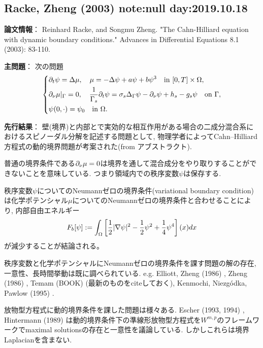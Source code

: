 \documentclass[a4paper]{jsarticle}
\begin{document}
\subsection{Racke, Zheng (2003) \cite{RackeZheng2003} note:null day:2019.10.18}
{\bf 論文情報}：
Reinhard Racke, and Songmu Zheng. "The Cahn-Hilliard equation with dynamic boundary conditions." Advances in Differential Equations 8.1 (2003): 83-110.

{\bf 主問題}：
次の問題
\begin{equation}\left\{\begin{aligned}
	&\partial_t\psi = \Delta\mu,\quad \mu = -\Delta\psi + a\psi + b\psi^3\quad \text{in }[0,T]\times\Omega,\\
	&\partial_{\nu}\mu|_{\Gamma} = 0, \quad \frac{1}{\Gamma_s}\partial_t\psi = \sigma_s\Delta_{\Gamma}\psi - \partial_{\nu}\psi + h_s - g_s\psi\quad\text{on }\Gamma,\\
	&\psi(0,\cdot) = \psi_0\quad\text{in }\Omega.
\end{aligned}\right.\end{equation}

{\bf 先行結果}：
壁(境界)と内部とで実効的な相互作用がある場合の二成分混合系におけるスピノーダル分解を記述する問題として, 物理学者によってCahn--Hilliard方程式の動的境界問題が考案された(from アブストラクト).

普通の境界条件である$\partial_{\nu}\mu=0$は境界を通して混合成分をやり取りすることができないことを意味している.
つまり領域内での秩序変数$\psi$は保存する.

秩序変数$\psi$についてのNeumannゼロの境界条件(variational boundary condition)は化学ポテンシャル$\mu$についてのNeumannゼロの境界条件と合わせることにより, 内部自由エネルギー
\begin{equation}
	F_b[\psi] := \int_{\Omega} \left[\frac{1}{2}|\nabla\psi|^2 - \frac{1}{2}\psi^2 + \frac{1}{4}\psi^4\right](x)dx
\end{equation}
が減少することが結論される。

秩序変数と化学ポテンシャルにNeumannゼロの境界条件を課す問題の解の存在, 一意性、長時間挙動は既に調べられている.
e.g. Elliott, Zheng (1986) \cite{ElliottZheng1986}, Zheng (1986) \cite{Zheng1986}, Temam (BOOK) \cite{TemamBOOK} (最新のものをciteしておく), Kenmochi, Niezg\'odka, Pawlow (1995) \cite{KenmochiNiezgodkaPawlow1995}.

放物型方程式に動的境界条件を課した問題は様々ある.
Escher (1993, 1994) \cite{Escher1993,Escher1994}, Hintermann (1989) \cite{Hintermann1989} は動的境界条件下の準線形放物型方程式を$W^{m,p}$のフレームワークでmaximal solutionsの存在と一意性を議論している.
しかしこれらは境界Laplacianを含まない.
\end{document}
